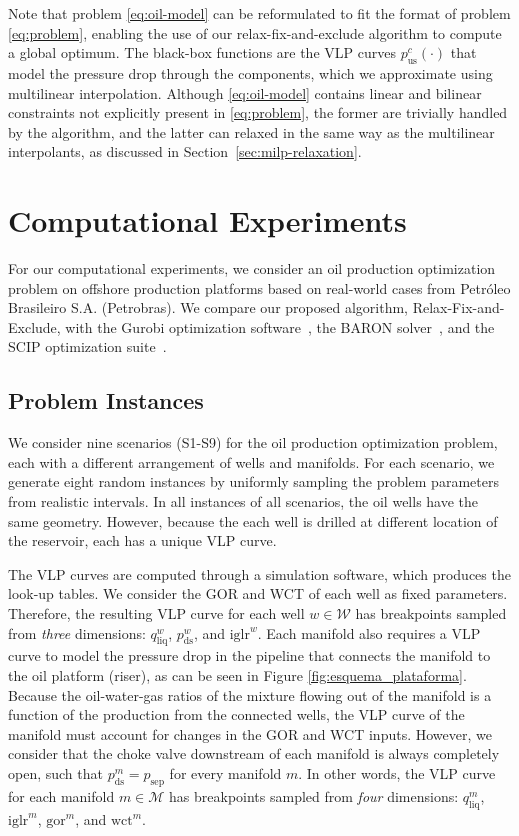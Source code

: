 \documentclass[pdflatex,sn-mathphys-num]{sn-jnl}%
\newcommand{\new}[1]{#1}
\begin{document}
Note that problem \eqref{eq:oil-model} can  be reformulated to fit the format of problem \eqref{eq:problem}, enabling the use of our relax-fix-and-exclude algorithm to compute a global optimum.
The black-box functions are the VLP curves $p_{\text{us}}^c(\cdot)$ that model the pressure drop through the components, \new{which we approximate using multilinear interpolation}.
Although \eqref{eq:oil-model} contains linear and bilinear constraints not explicitly present in \eqref{eq:problem}, the former are trivially handled by the algorithm, and the latter \new{can relaxed in the same way as the multilinear interpolants}, as discussed in Section~\ref{sec:milp-relaxation}.


\section{Computational Experiments}\label{sec:experiments}

For our computational experiments, we consider an oil production optimization problem on offshore production platforms based on real-world cases from Petróleo Brasileiro S.A. (Petrobras). We compare our proposed algorithm, Relax-Fix-and-Exclude, with the Gurobi optimization software~\cite{gurobi}, the BARON solver~\cite{baron2018}, and the SCIP optimization suite~\cite{SCIP}.

\subsection{Problem Instances}

\new{%
We consider nine scenarios (S1-S9) for the oil production optimization problem, each with a different arrangement of wells and manifolds.
For each scenario, we generate eight random instances by uniformly sampling the problem parameters from realistic intervals.
In all instances of all scenarios, the oil wells have the same geometry.
However, because the each well is drilled at different location of the reservoir, each has a unique VLP curve.
}

The VLP curves are computed through a simulation software, which produces the look-up tables.
We consider the GOR and WCT of each well as fixed parameters.
\new{Therefore, the resulting VLP curve for each well $w\in \mathcal{W}$ has breakpoints sampled from \emph{three} dimensions: $q_{\text{liq}}^{w}$, $p_{\text{ds}}^{w}$, and $\text{iglr}^{w}$.}
Each manifold also requires a VLP curve to model the pressure drop in the pipeline that connects the manifold to the oil platform (riser), as can be seen in Figure \ref{fig:esquema_plataforma}.
Because the oil-water-gas ratios of the mixture flowing out of the manifold is a function of the production from the connected wells, the VLP curve of the manifold must account for changes in the GOR and WCT inputs.
However, we consider that the choke valve downstream of each manifold is always completely open, such that $p_{\text{ds}}^m=p_{\text{sep}}$ for every manifold $m$.
\new{In other words, the VLP curve for each manifold $m\in \mathcal{M}$ has breakpoints sampled from \emph{four} dimensions: $q_{\text{liq}}^{m}$, $\text{iglr}^{m}$, $\text{gor}^{m}$, and $\text{wct}^{m}$.}
\end{document}
